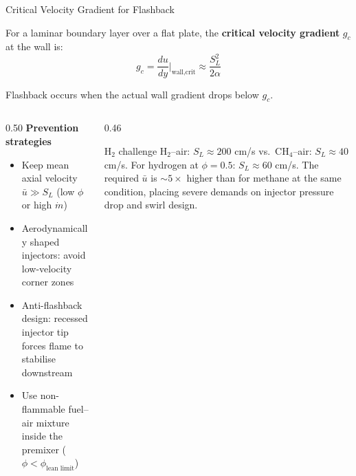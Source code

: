 \documentclass[12pt,aspectratio=169]{beamer}
\newcommand{\mdot}{\dot{m}}
\newcommand{\SL}{S_L}
\newcommand{\alphath}{\alpha}
\begin{document}
\begin{frame}{Critical Velocity Gradient for Flashback}

  For a laminar boundary layer over a flat plate, the
  \textbf{critical velocity gradient} $g_c$ at the wall is:
  \[
    g_c = \frac{du}{dy}\bigg|_{\text{wall,crit}}
    \approx \frac{\SL^2}{2\alphath}
  \]

  Flashback occurs when the actual wall gradient drops below $g_c$.

  \vspace{3pt}
  \begin{columns}[t]
    \begin{column}{0.50\textwidth}
      \textbf{Prevention strategies}
      \begin{itemize}
        \item Keep mean axial velocity $\bar{u} \gg \SL$
              (low $\phi$ or high $\mdot$)
        \item Aerodynamically shaped injectors:
              avoid low-velocity corner zones
        \item Anti-flashback design: recessed injector tip
              forces flame to stabilise downstream
        \item Use non-flammable fuel--air mixture inside
              the premixer ($\phi < \phi_{\text{lean limit}}$)
      \end{itemize}
    \end{column}
    \begin{column}{0.46\textwidth}
      \begin{exampleblock}{H$_2$ challenge}
        H$_2$--air: $\SL \approx 200$ cm/s vs.\ CH$_4$--air:
        $\SL \approx 40$ cm/s.
        For hydrogen at $\phi = 0.5$: $\SL \approx 60$ cm/s.
        The required $\bar{u}$ is $\sim 5\times$ higher than
        for methane at the same condition, placing severe
        demands on injector pressure drop and swirl design.
      \end{exampleblock}
    \end{column}
  \end{columns}
\end{frame}
\end{document}
